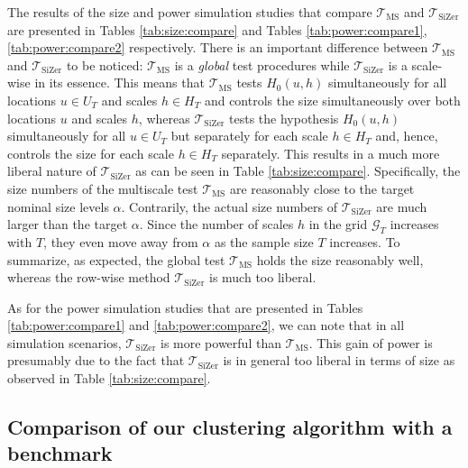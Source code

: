 \documentclass[12pt]{article}
\begin{document}
{The results of the size and power simulation studies that compare $\mathcal{T}_{\text{MS}}$ and $\mathcal{T}_{\text{SiZer}}$ are presented in Tables \ref{tab:size:compare} and Tables \ref{tab:power:compare1}, \ref{tab:power:compare2} respectively. There is an important difference between $\mathcal{T}_{\text{MS}}$ and $\mathcal{T}_{\text{SiZer}}$ to be noticed: $\mathcal{T}_{\text{MS}}$ is a \textit{global} test procedures while $\mathcal{T}_{\text{SiZer}}$ is a scale-wise in its essence. This means that $\mathcal{T}_{\text{MS}}$ tests $H_0(u,h)$ simultaneously for all locations $u \in U_T$ and scales $h \in H_T$ and controls the size simultaneously over both locations $u$ and scales $h$, whereas $\mathcal{T}_{\text{SiZer}}$ tests the hypothesis $H_0(u,h)$ simultaneously for all $u \in U_T$ but separately for each scale $h \in H_T$ and, hence, controls the size for each scale $h \in H_T$ separately. This results in a much more liberal nature of $\mathcal{T}_{\text{SiZer}}$ as can be seen in Table \ref{tab:size:compare}. Specifically, the size numbers of the multiscale test $\mathcal{T}_{\text{MS}}$ are reasonably close to the target nominal size levels $\alpha$. Contrarily, the actual size numbers of $\mathcal{T}_{\text{SiZer}}$ are much larger than the target $\alpha$. Since the number of scales $h$ in the grid $\mathcal{G}_T$ increases with $T$, they even move away from $\alpha$ as the sample size $T$ increases. To summarize, as expected, the global test $\mathcal{T}_{\text{MS}}$ holds the size reasonably well, whereas the row-wise method $\mathcal{T}_{\text{SiZer}}$ is much too liberal. 

As for the power simulation studies that are presented  in Tables \ref{tab:power:compare1} and \ref{tab:power:compare2}, we can note that in all simulation scenarios, $\mathcal{T}_{\text{SiZer}}$ is more powerful than $\mathcal{T}_{\text{MS}}$. This gain of power is presumably due to the fact that $\mathcal{T}_{\text{SiZer}}$ is in general too liberal in terms of size as observed in Table \ref{tab:size:compare}.

\subsection{Comparison of our clustering algorithm with a benchmark}


}
\end{document}
